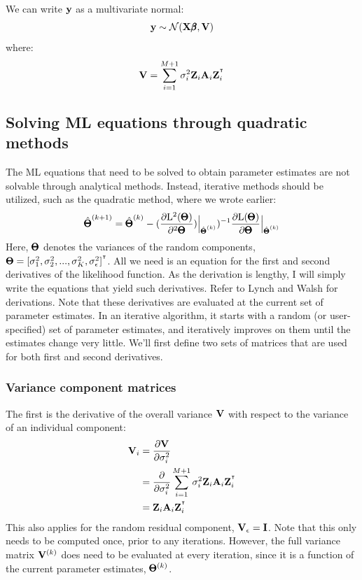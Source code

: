 \documentclass[12pt]{article}
\begin{document}
We can write $\mathbf{y}$ as a multivariate normal:
$$ \mathbf{y} \sim \mathcal{N}(\mathbf{X} \pmb{\beta}, \mathbf{V}) $$
where:
$$ \mathbf{V} = \sum_{i=1}^{M+1} \sigma^2_i \mathbf{Z}_i \mathbf{A}_i \mathbf{Z}_i^{^\intercal} $$

\subsection{Solving ML equations through quadratic methods}
The ML equations that need to be solved to obtain parameter estimates are not solvable through analytical methods.
Instead, iterative methods should be utilized, such as the quadratic method, where we wrote earlier:
$$
\hat{\pmb{\Theta}}^{(k+1)} = 
\hat{\pmb{\Theta}}^{(k)} -
(\frac{\partial \mathrm{L}^2(\pmb{\Theta})}{\partial^2 \pmb{\Theta}})
\Bigr|_{\hat{\pmb{\Theta}}^{(k)} })^{-1} 
\frac{\partial \mathrm{L}(\pmb{\Theta})}{\partial \pmb{\Theta}}
\Bigr|_{\hat{\pmb{\Theta}}^{(k)} }
$$
Here, $\pmb{\Theta}$ denotes the variances of the random components, $\pmb{\Theta} = [ \sigma^2_1, \sigma^2_2, ... , \sigma^2_K, \sigma^2_{\epsilon} ]^{^\intercal}$.
All we need is an equation for the first and second derivatives of the likelihood function.
As the derivation is lengthy, I will simply write the equations that yield such derivatives.
Refer to Lynch and Walsh \citep[pg. 784]{lynch1998book} for derivations.
Note that these derivatives are evaluated at the current set of parameter estimates.
In an iterative algorithm, it starts with a random (or user-specified) set of parameter estimates, and iteratively improves on them until the estimates change very little.
We'll first define two sets of matrices that are used for both first and second derivatives.

\subsubsection{Variance component matrices}
The first is the derivative of the overall variance $\mathbf{V}$ with respect to the variance of an individual component:
\begin{align*}
    \mathbf{V}_i &= \frac{\partial \mathbf{V}}{\partial \sigma^2_i} \\
    &= \frac{\partial}{\partial \sigma^2_i}
    \sum_{i=1}^{M+1} \sigma^2_i \mathbf{Z}_i \mathbf{A}_i \mathbf{Z}_i^{^\intercal} \\
    &= \mathbf{Z}_i \mathbf{A}_i \mathbf{Z}_i^{^\intercal}
\end{align*}
This also applies for the random residual component, $\mathbf{V}_{\epsilon} = \mathbf{I}$.
Note that this only needs to be computed once, prior to any iterations.
However, the full variance matrix $\mathbf{V}^{(k)}$ does need to be evaluated at every iteration, since it is a function of the current parameter estimates, $\pmb{\Theta}^{(k)}$.
\end{document}
